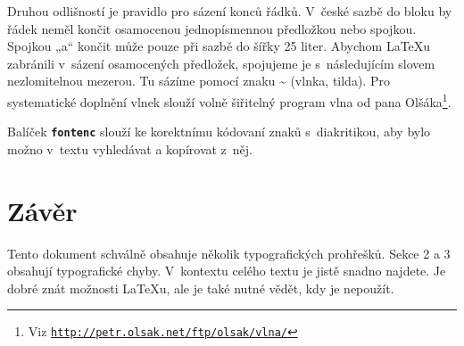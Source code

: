 \documentclass[twocolumn]{article}
\begin{document}
Druhou odlišností je pravidlo pro sázení konců řádků. V~české sazbě do bloku by řádek neměl končit osamocenou jednopísmennou předložkou nebo spojkou. Spojkou „a“ končit může pouze při sazbě do šířky 25 liter. Abychom \LaTeX u zabránili v~sázení osamocených předložek, spojujeme je s~následujícím slovem nezlomitelnou mezerou. Tu sázíme pomocí znaku \~{} (vlnka, tilda). Pro systematické doplnění vlnek slouží volně šiřitelný program vlna od pana Olšáka\footnote{Viz \href { http://petr.olsak.net/ftp/olsak/vlna/}{\texttt{http://petr.olsak.net/ftp/olsak/vlna/}}}.\par

Balíček \textbf{ \texttt {fontenc}} slouží ke korektnímu kódovaní znaků s~diakritikou, aby bylo možno v~textu vyhledávat a kopírovat z~něj.
  
  \section{Závěr}
Tento dokument schválně obsahuje několik typografických
prohřešků. Sekce 2 a 3 obsahují typografické chyby. V~kontextu celého textu je jistě snadno najdete. Je dobré znát
možnosti \LaTeX u, ale je také nutné vědět, kdy je nepoužít.

  
\end{document}
